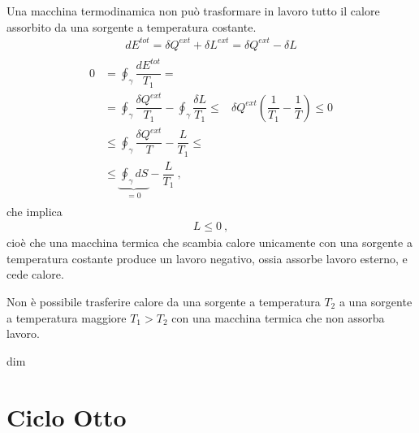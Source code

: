 \documentclass[letterpaper,10pt,italian]{jupyterBook}
\begin{document}
\sphinxAtStartPar
{} Una macchina termodinamica non può trasformare in lavoro tutto il calore assorbito da una sorgente a temperatura costante.
\begin{equation*}
\begin{split}d E^{tot} = \delta Q^{ext} + \delta L^{ext} = \delta Q^{ext} - \delta L\end{split}
\end{equation*}\begin{equation*}
\begin{split}\begin{aligned}
  0 & = \oint_{\gamma} \dfrac{d E^{tot}}{T_1} = \\
    & = \oint_{\gamma} \dfrac{\delta Q^{ext}}{T_1} - \oint_{\gamma} \dfrac{\delta L}{T_1} \le & \delta Q^{ext} \left(\dfrac{1}{T_1} - \dfrac{1}{T} \right) \le 0 \\
    & \le \oint_{\gamma} \dfrac{\delta Q^{ext}}{T} - \dfrac{L}{T_1} \le \\
    & \le \underbrace{ \oint_{\gamma} d S}_{=0} - \dfrac{L}{T_1} \ ,
\end{aligned}\end{split}
\end{equation*}
\sphinxAtStartPar
che implica
\begin{equation*}
\begin{split}L \le 0 \ ,\end{split}
\end{equation*}
\sphinxAtStartPar
cioè che una macchina termica che scambia calore unicamente con una sorgente a temperatura costante produce un lavoro negativo, ossia assorbe lavoro esterno, e cede calore.

\sphinxAtStartPar
{} Non è possibile trasferire calore da una sorgente a temperatura \(T_2\) a una sorgente a temperatura maggiore \(T_1 > T_2\) con una macchina termica che non assorba lavoro.

\sphinxAtStartPar
{} dim

\sphinxstepscope


\section{Ciclo Otto}
\label{\detokenize{ch/thermodynamics/heat-engine-otto:ciclo-otto}}\label{\detokenize{ch/thermodynamics/heat-engine-otto:physics-hs-thermodynamics-heat-engine-otto}}\label{\detokenize{ch/thermodynamics/heat-engine-otto::doc}}
\sphinxAtStartPar
{}
\end{document}
